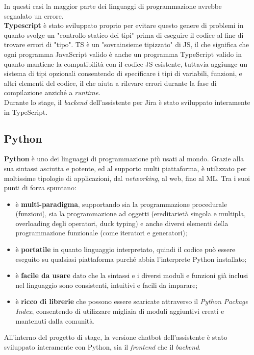 In questi casi la maggior parte dei linguaggi di programmazione avrebbe segnalato un errore.\\
\textbf{Typescript} è stato sviluppato proprio per evitare questo genere di problemi in quanto svolge un "controllo statico dei tipi" prima di eseguire il codice al fine di trovare errori di "tipo".
TS è un "sovrainsieme tipizzato" di JS, il che significa che ogni programma JavaScript valido è anche un programma TypeScript valido in quanto mantiene la compatibilità con il codice JS esistente, tuttavia aggiunge un sistema di tipi opzionali consentendo di specificare i tipi di variabili, funzioni, e altri elementi del codice, il che aiuta a rilevare errori durante la fase di compilazione anziché a \textit{runtime}.\\
Durante lo stage, il \textit{backend} dell'assistente per Jira è stato sviluppato interamente in TypeScript. 

\subsection{Python}
\textbf{Python} è uno dei linguaggi di programmazione più usati al mondo. Grazie alla sua sintassi asciutta e potente, ed al supporto multi piattaforma, è utilizzato per moltissime tipologie di applicazioni, dal \textit{networking}, al web, fino al ML.
Tra i suoi punti di forza spuntano:
\begin{itemize}
    \item è \textbf{multi-paradigma}, supportando sia la programmazione procedurale (funzioni), sia la programmazione ad oggetti (ereditarietà singola e multipla, overloading degli operatori, duck typing) e anche diversi elementi della programmazione funzionale (come iteratori e generatori);
    \item è \textbf{portatile} in quanto linguaggio interpretato, quindi il codice può essere eseguito su qualsiasi piattaforma purché abbia l’interprete Python installato;
    \item è \textbf{facile da usare} dato che la sintassi e i diversi moduli e funzioni già inclusi nel linguaggio sono consistenti, intuitivi e facili da imparare;
    \item è \textbf{ricco di librerie} che possono essere scaricate attraverso il \textit{Python Package Index}, consentendo di utilizzare migliaia di moduli aggiuntivi creati e mantenuti dalla comunità.
\end{itemize}

All'interno del progetto di stage, la versione chatbot dell'assistente è stato sviluppato interamente con Python, sia il \textit{frontend} che il \textit{backend}.

